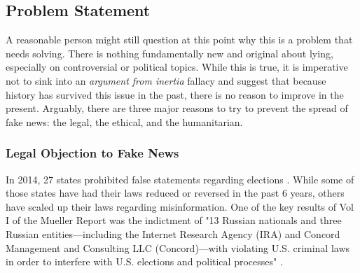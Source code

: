 \documentclass[preprint,review,12pt]{elsarticle}
\begin{document}
\subsection{Problem Statement}
\label{Problem Statement}
A reasonable person might still question at this point why this is a problem that needs solving. There is nothing fundamentally new and original about lying, especially on controversial or political topics. While this is true, it is imperative not to sink into an \textit{argument from inertia} fallacy \cite{bennett2012logically} and suggest that because history has survived this issue in the past, there is no reason to improve in the present. Arguably, there are three major reasons to try to prevent the spread of fake news: the legal, the ethical, and the humanitarian.

\subsubsection{Legal Objection to Fake News}
In 2014, 27 states prohibited false statements regarding elections \cite{Vasilogambros2019political}. While some of those states have had their laws reduced or reversed in the past 6 years, others have scaled up their laws regarding misinformation. One of the key results of Vol I of the Mueller Report was the indictment of "13 Russian nationals and three Russian entities—including the Internet
Research Agency (IRA) and Concord Management and Consulting LLC (Concord)—with violating U.S. criminal laws in order to interfere with U.S. elections and political processes" \cite{mueller2019mueller,mueller2020internet}.
\end{document}
